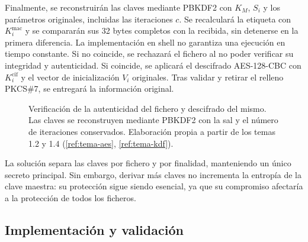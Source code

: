 Finalmente, se reconstruirán las claves mediante PBKDF2 con $K_M$, $S_i$ y los parámetros originales, incluidas las iteraciones $c$.
Se recalculará la etiqueta con $K_i^{\mathrm{mac}}$ y se compararán sus 32 bytes completos con la recibida, sin detenerse en la primera diferencia. La implementación en shell no garantiza una ejecución en tiempo constante. Si no coincide, se rechazará el fichero al no poder verificar su integridad y autenticidad.
Si coincide, se aplicará el descifrado AES-128-CBC con $K_i^{\mathrm{cif}}$ y el vector de inicialización $V_i$ originales. Tras validar y retirar el relleno PKCS\#7, se entregará la información original.

\begin{figure}[H]
  \centering
  \resizebox{\linewidth}{!}{}
  \caption{Verificación de la autenticidad del fichero y descifrado del mismo. Las claves se reconstruyen mediante PBKDF2 con la sal y el número de iteraciones conservados. Elaboración propia a partir de los temas 1.2 y 1.4 (\ref{ref:tema-aes}, \ref{ref:tema-kdf}).}
  \label{fig:p1-descifrado}
\end{figure}

La solución separa las claves por fichero y por finalidad, manteniendo un único secreto principal.
Sin embargo, derivar más claves no incrementa la entropía de la clave maestra: su protección sigue siendo esencial, ya que su compromiso afectaría a la protección de todos los ficheros.


\subsection{Implementación y validación}

